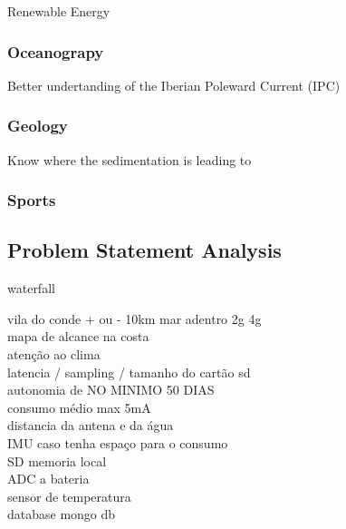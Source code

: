 Renewable Energy 

\subsubsection{Oceanograpy}
Better undertanding of the Iberian Poleward Current (IPC)

\subsubsection{Geology}

Know where the sedimentation is leading to
\subsubsection{Sports}

\subsection{Problem Statement Analysis}

waterfall

vila do conde + ou - 10km mar adentro 2g 4g\\
mapa de alcance na costa\\
atenção ao clima \\
latencia / sampling / tamanho do cartão sd\\ 
autonomia de NO MINIMO 50 DIAS \\
consumo médio max 5mA \\
distancia da antena e da água \\
IMU caso tenha espaço para o consumo \\
SD memoria local \\
ADC a bateria \\
sensor de temperatura \\
database mongo db \\
